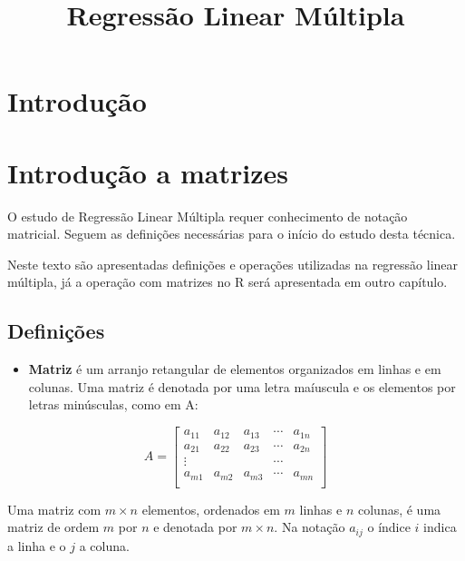 \documentclass[
]{book}
\title{Regressão Linear Múltipla}
\author{}
\date{\vspace{-2.5em}}
\providecommand{\tightlist}{%
  \setlength{\itemsep}{0pt}\setlength{\parskip}{0pt}}
\begin{document}
\maketitle

{
\setcounter{tocdepth}{1}
\tableofcontents
}
\hypertarget{introduuxe7uxe3o}{%
\chapter{Introdução}\label{introduuxe7uxe3o}}

\hypertarget{intro}{%
\chapter{Introdução a matrizes}\label{intro}}

O estudo de Regressão Linear Múltipla requer conhecimento de notação matricial. Seguem as definições necessárias para o início do estudo desta técnica.

Neste texto são apresentadas definições e operações utilizadas na regressão linear múltipla, já a operação com matrizes no R será apresentada em outro capítulo.

\hypertarget{definiuxe7uxf5es}{%
\section{Definições}\label{definiuxe7uxf5es}}

\begin{itemize}
\tightlist
\item
  \textbf{Matriz} é um arranjo retangular de elementos organizados em linhas e em colunas. Uma matriz é denotada por uma letra maíuscula e os elementos por letras minúsculas, como em A:
\end{itemize}

\begin{equation*}
A = 
\begin{bmatrix}
a_{11} & a_{12} & a_{13} & \cdots & a_{1n} \\
a_{21} & a_{22} & a_{23} & \cdots & a_{2n} \\
\vdots &        &        & \cdots &        \\
a_{m1} & a_{m2} & a_{m3} & \cdots & a_{mn} \\
\end{bmatrix}
\end{equation*}

Uma matriz com \(m \times n\) elementos, ordenados em \(m\) linhas e \(n\) colunas, é uma matriz de ordem \(m\) por \(n\) e denotada por \(m \times n\). Na notação \(a_{ij}\) o índice \(i\) indica a linha e o \(j\) a coluna.
\end{document}

